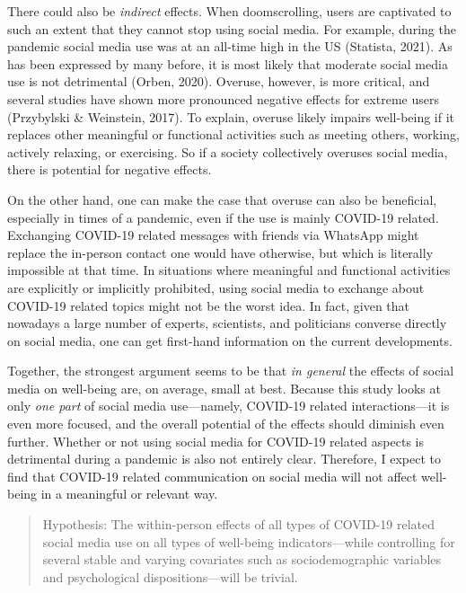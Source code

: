 \documentclass[
  english,
  man,mask,floatsintext]{apa6}
\begin{document}
There could also be \emph{indirect} effects.
When doomscrolling, users are captivated to such an extent that they cannot stop using social media.
For example, during the pandemic social media use was at an all-time high in the US (Statista, 2021).
As has been expressed by many before, it is most likely that moderate social media use is not detrimental (Orben, 2020).
Overuse, however, is more critical, and several studies have shown more pronounced negative effects for extreme users (Przybylski \& Weinstein, 2017).
To explain, overuse likely impairs well-being if it replaces other meaningful or functional activities such as meeting others, working, actively relaxing, or exercising.
So if a society collectively overuses social media, there is potential for negative effects.

On the other hand, one can make the case that overuse can also be beneficial, especially in times of a pandemic, even if the use is mainly COVID-19 related.
Exchanging COVID-19 related messages with friends via WhatsApp might replace the in-person contact one would have otherwise, but which is literally impossible at that time.
In situations where meaningful and functional activities are explicitly or implicitly prohibited, using social media to exchange about COVID-19 related topics might not be the worst idea.
In fact, given that nowadays a large number of experts, scientists, and politicians converse directly on social media, one can get first-hand information on the current developments.

Together, the strongest argument seems to be that \emph{in general} the effects of social media on well-being are, on average, small at best.
Because this study looks at only \emph{one part} of social media use---namely, COVID-19 related interactions---it is even more focused, and the overall potential of the effects should diminish even further.
Whether or not using social media for COVID-19 related aspects is detrimental during a pandemic is also not entirely clear.
Therefore, I expect to find that COVID-19 related communication on social media will not affect well-being in a meaningful or relevant way.

\begin{quote}
Hypothesis: The within-person effects of all types of COVID-19 related social media use on all types of well-being indicators---while controlling for several stable and varying covariates such as sociodemographic variables and psychological dispositions---will be trivial.
\end{quote}
\end{document}
